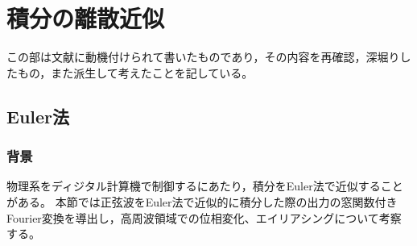 \chapter{積分の離散近似}
    この部は文献\cite{digital-servo}に動機付けられて書いたものであり，その内容を再確認，深堀りしたもの，また派生して考えたことを記している。
    \section{Euler法}
        \subsection{背景}
            物理系をディジタル計算機で制御するにあたり，積分をEuler法で近似することがある。
            本節では正弦波をEuler法で近似的に積分した際の出力の窓関数付きFourier変換を導出し，高周波領域での位相変化、エイリアシングについて考察する。
